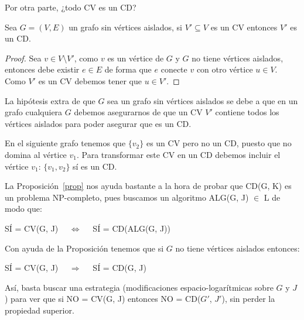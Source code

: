 \documentclass[12pt]{article}
\newcommand{\CD}{CD(G, K) }
\newcommand{\CV}{CV(G, J) }
\begin{document}
    \noindent
    Por otra parte, ¿todo CV es un CD? 
    \begin{prop}\label{prop}
        Sea $G=(V,E)$ un grafo sin vértices aislados, si $V'\subseteq V$ es un CV entonces $V'$ es un CD.
        \begin{proof}
            Sea $v\in V\setminus V'$, como $v$ es un vértice de $G$ y $G$ no tiene vértices aislados, entonces debe existir $e\in E$ de forma que $e$ conecte $v$ con otro vértice $u\in V$. Como $V'$ es un CV debemos tener que $u\in V'$.
        \end{proof}
    \end{prop}
    \noindent
    La hipótesis extra de que $G$ sea un grafo sin vértices aislados se debe a que en un grafo cualquiera $G$ debemos asegurarnos de que un CV $V'$ contiene todos los vértices aislados para poder asegurar que es un CD.
    \begin{ejemplo}
        En el siguiente grafo tenemos que $\{v_2\}$ es un CV pero no un CD, puesto que no domina al vértice $v_1$. Para transformar este CV en un CD debemos incluir el vértice $v_1$: $\{v_1,v_2\}$ sí es un CD.
        \begin{figure}[H]
            \centering
        \end{figure}
    \end{ejemplo}

    \noindent
    La Proposición~\ref{prop} nos ayuda bastante a la hora de probar que \CD es un problema NP-completo, pues buscamos un algoritmo ALG(G, J) $\in$ L de modo que:
    \begin{center}
        SÍ = \CV $\quad\Longleftrightarrow\quad $ SÍ = CD(ALG(G, J))
    \end{center}
    Con ayuda de la Proposición tenemos que si $G$ no tiene vértices aislados entonces:
    \begin{center}
        SÍ = \CV $\quad\Longrightarrow\quad$ SÍ = CD(G, J)
    \end{center}
    Así, basta buscar una estrategia (modificaciones espacio-logarítmicas sobre $G$ y $J$) para ver que si NO = \CV entonces NO = CD($G'$, $J'$), sin perder la propiedad superior.\\
\end{document}
